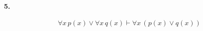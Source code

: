 \documentclass[]{exam}
\begin{document}
\paragraph[5.1]{5.}

$$\forall x \, p(x) \lor \forall x \, q(x) \vdash \forall x \, (p(x) \lor q(x))$$
\end{document}
